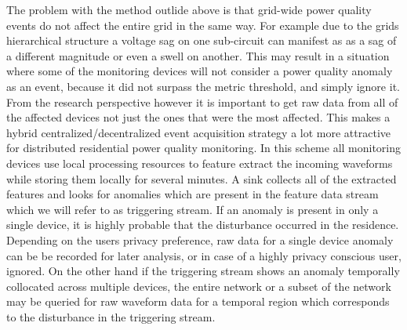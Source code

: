 The problem with the method outlide above is that grid-wide power quality events do not affect the entire grid in the same way. For example due to the grids hierarchical structure a voltage sag on one sub-circuit can manifest as as a sag of a different magnitude or even a swell on another. This may result in a situation where some of the monitoring devices will not consider a power quality anomaly as an event, because it did not surpass the metric threshold, and simply ignore it. From the research perspective however it is important to get raw data from all of the affected devices not just the ones that were the most affected. This makes a hybrid centralized/decentralized event acquisition strategy a lot more attractive for distributed residential power quality monitoring. In this scheme all monitoring devices use local processing resources to feature extract the incoming waveforms while storing them locally for several minutes. A sink collects all of the extracted features and looks for anomalies which are present in the feature data stream which we will refer to as triggering stream. If an anomaly is present in only a single device, it is highly probable that the disturbance occurred in the residence. Depending on the users privacy preference, raw data for a single device anomaly can be be recorded for later analysis, or in case of a highly privacy conscious user, ignored. On the other hand if the triggering stream shows an anomaly temporally collocated across multiple devices, the entire network or a subset of the network may be queried for raw waveform data for a temporal region which corresponds to the disturbance in the triggering stream.

